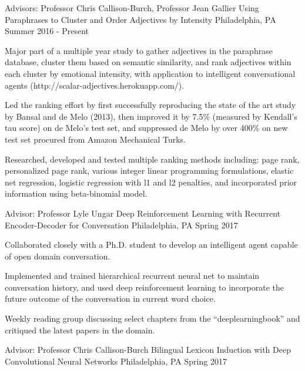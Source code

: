 \begin{cventries}
  \cventry
    {Advisors: Professor Chris Callison-Burch, Professor Jean Gallier}
    {Using Paraphrases to Cluster and Order Adjectives by Intensity}
    {Philadelphia, PA}
    {Summer 2016 - Present}
    {
      \begin{cvitems}
        \item {Major part of a multiple year study to gather adjectives in the paraphrase database, cluster them based on semantic similarity, and rank adjectives within each cluster by emotional intensity, with application to intelligent conversational agents  (http://scalar-adjectives.herokuapp.com/).}
        \item {Led the ranking effort by first successfully reproducing the state of the art study by Bansal and de Melo (2013), then improved it by 7.5\% (measured by Kendall's tau score) on de Melo’s test set, and suppressed de Melo by over 400\% on new test set procured from Amazon Mechanical Turks.}
        \item {Researched, developed and tested multiple ranking methods including: page rank, personalized page rank, various integer linear programming formulations, elastic net regression, logistic regression with l1 and l2 penalties, and incorporated prior information using beta-binomial model.}
      \end{cvitems}
    }
  \cventry
    {Advisor: Professor Lyle Ungar}
    {Deep Reinforcement Learning with Recurrent Encoder-Decoder for Conversation}
    {Philadelphia, PA}
    {Spring 2017}
    {
      \begin{cvitems}
        \item {Collaborated closely with a Ph.D. student to develop an intelligent agent capable of open domain conversation.}
        \item {Implemented and trained hierarchical recurrent neural net to maintain conversation history, and used deep reinforcement learning to incorporate the future outcome of the conversation in current word choice.}
        \item {Weekly reading group discussing select chapters from the “deeplearningbook” and critiqued the latest papers in the domain.}
      \end{cvitems}
    }
  \cventry
    {Advisor: Professor Chris Callison-Burch}
    {Bilingual Lexicon Induction with Deep Convolutional Neural Networks}
    {Philadelphia, PA}
    {Spring 2017}
    {
}
\end{cventries}
